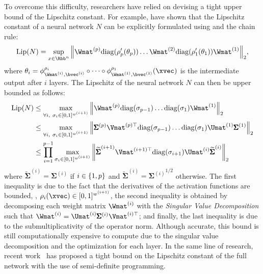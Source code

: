 \noindent
To overcome this difficulty, researchers have relied on devising a tight upper bound of the Lipschitz constant.
For example, \citet{scaman2018lipschitz} have shown that the Lipschitz constant of a neural network $N$ can be explicitly formulated using  and the chain rule:
\begin{equation} \label{equation:ch3-decomposition_jacobian_lipschitz}
  \lip{\nn} = \sup_{x \in \Rbb^n} \norm{\Wmat^{(p)} \diag(\rho'_\depth(\theta_\depth)) \dots \Wmat^{(2)} \diag(\rho'_1(\theta_1)) \Wmat^{(1)}}_2,
\end{equation}
where $\theta_i = \layer^{\act_i}_{\Wmat^{(i)}, \bvec^{(i)}} \circ \cdots \circ \layer^{\act_1}_{\Wmat^{(1)}, \bvec^{(1)}}(\xvec)$ is the intermediate output after $i$ layers.
The Lipschitz of the neural network $N$ can then be upper bounded as follows:
\begin{align}
  \lip{\nn} &\leq \max_{\forall i,\ \sigma_i \in [0, 1]^{w^{(i+1)}}} \norm{\Wmat^{(\depth)} \diag(\sigma_{\depth-1}) \dots \diag(\sigma_1) \Wmat^{(1)}}_2 \notag \\
  &\leq \max_{\forall i,\ \sigma_i \in [0, 1]^{w^{(i+1)}}} \norm{ \pmb{\Sigma}^{(\depth)} \Vmat^{(\depth)\top} \diag(\sigma_{\depth-1}) \dots \diag(\sigma_1) \Umat^{(1)} \pmb{\Sigma}^{(1)}}_2 \notag \\
  &\leq \prod_{i=1}^{\depth-1} \max_{\sigma_i \in [0, 1]^{w^{(i+1)}}} \norm{\widetilde{\pmb{\Sigma}}^{(i+1)} \Vmat^{(i+1)\top} \diag(\sigma_{i+1}) \Umat^{(i)} \widetilde{\pmb{\Sigma}}^{(i)}}_2 
\end{align}
where $\widetilde{\pmb{\Sigma}}^{(i)} = \pmb{\Sigma}^{(i)}$ if $i \in \{1, p\}$ and $\widetilde{\pmb{\Sigma}}^{(i)} = {\pmb{\Sigma}^{(i)}}^{1/2}$ otherwise.
The first inequality is due to the fact that the derivatives of the activation functions are bounded, \ie, $\rho_i(\xvec) \in [0, 1]^{w^{(i+1)}}$, the second inequality is obtained by decomposing each weight matrix $\Wmat^{(i)}$ with the \emph{Singular Value Decomposition} such that $\Wmat^{(i)} = \Umat^{(i)} \pmb{\Sigma}^{(i)} \Vmat^{(i)\top}$; and finally, the last inequality is due to the submultiplicativity of the operator norm.
Although accurate, this bound is still computationally expensive to compute due to the singular value decomposition and the optimization for each layer. 
In the same line of research, recent work~\cite{fazlyab2019safety,fazlyab2019efficient,latorre2020lipschitz} has proposed a tight bound on the Lipschitz constant of the full network with the use of semi-definite programming.

